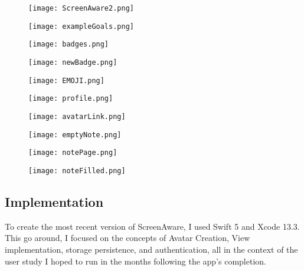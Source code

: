 \documentclass[12pt, title page, manuscript, nonacm]{acmart}
\begin{document}
\begin{figure}[h]
    \texttt{[image: ScreenAware2.png]}
    \caption{}
\endminipage
\hspace{1.5cm}
    \texttt{[image: exampleGoals.png]}
    \caption{}
\endminipage
\hspace{1.5cm}
    \texttt{[image: badges.png]}
    \caption{}
\endminipage
\hspace{1.5cm}
    \texttt{[image: newBadge.png]}
    \caption{}
\endminipage
\hspace{1.5cm}
    \texttt{[image: EMOJI.png]}
    \caption{}
\endminipage
\end{figure}
\begin{figure}[h]
    \texttt{[image: profile.png]}
    \caption{}
\endminipage
\hspace{1.5cm}
    \texttt{[image: avatarLink.png]}
    \caption{}
\endminipage
\hspace{1.5cm}
    \texttt{[image: emptyNote.png]}
    \caption{}
\endminipage
\hspace{1.5cm}
    \texttt{[image: notePage.png]}
    \caption{}
\endminipage
\hspace{1.5cm}
    \texttt{[image: noteFilled.png]}
    \caption{}
\endminipage
\end{figure}
\subsection*{Implementation}
To create the most recent version of ScreenAware, I used Swift 5 and Xcode 13.3. This go around, I focused on the concepts of Avatar Creation, View implementation, storage persistence, and authentication, all in the context of the user study I hoped to run in the months following the app's completion.
\end{document}
